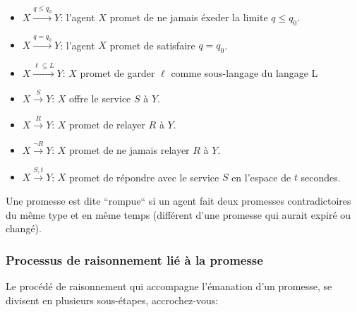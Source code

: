 \begin{itemize}
    \item $X \xrightarrow{q \leq q_0} Y $: l'agent $X$ promet de ne jamais éxeder la
        limite $q \leq q_0$.
    \item $X \xrightarrow{q = q_0} Y $: l'agent $X$ promet de satisfaire
        $q = q_0$.
    \item $X \xrightarrow{\ell \subseteq  L} Y $: $X$ promet de garder $\ell$
        comme sous-langage du langage L
    \item $X \xrightarrow{S} Y $: $X$ offre le service $S$ à $Y$.
    \item $X \xrightarrow{R} Y $: $X$ promet de relayer $R$ à $Y$.
    \item $X \xrightarrow{\neg R} Y $: $X$ promet de ne jamais relayer $R$ à $Y$.
    \item $X \xrightarrow{S,t} Y $: $X$ promet de répondre avec le service $S$
        en l'espace de $t$ secondes.
\end{itemize}

Une promesse est dite ``rompue`` si un agent fait deux promesses contradictoires du
même type et en même temps (différent d'une promesse qui aurait expiré ou changé).

\subsubsection{Processus de raisonnement lié à la promesse}

Le procédé de raisonnement qui accompagne l'émanation d'un promesse, se divisent
en plusieurs sous-étapes, accrochez-vous:

